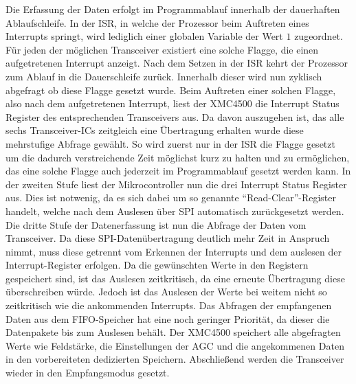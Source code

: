 Die Erfassung der Daten erfolgt im Programmablauf innerhalb der dauerhaften Ablaufschleife.
In der \acl{ISR}, in welche der Prozessor beim Auftreten eines Interrupts springt, wird lediglich einer globalen Variable der Wert $1$ zugeordnet. Für jeden der möglichen Transceiver existiert eine solche Flagge, die einen aufgetretenen Interrupt anzeigt. Nach dem Setzen in der \ac{ISR} kehrt der Prozessor zum Ablauf in die Dauerschleife zurück. Innerhalb dieser wird nun zyklisch abgefragt ob diese Flagge gesetzt wurde. Beim Auftreten einer solchen Flagge, also nach dem aufgetretenen Interrupt, liest der XMC4500 die  Interrupt Status Register des entsprechenden Transceivers aus. 
Da davon auszugehen ist, das alle sechs Transceiver-\acp{IC} zeitgleich eine Übertragung erhalten wurde diese mehrstufige Abfrage gewählt. So wird zuerst nur in der \ac{ISR} die Flagge gesetzt um die dadurch verstreichende Zeit möglichst kurz zu halten und zu ermöglichen, das eine solche Flagge auch jederzeit im Programmablauf gesetzt werden kann. In der zweiten Stufe liest der Mikrocontroller nun die drei Interrupt Status Register aus. Dies ist notwenig, da es sich dabei um so genannte \enquote{Read-Clear}-Register handelt, welche  nach dem Auslesen über SPI automatisch zurückgesetzt werden.
Die dritte Stufe  der Datenerfassung ist nun die Abfrage der Daten vom Transceiver. Da diese \ac{SPI}-Datenübertragung deutlich mehr Zeit in Anspruch nimmt, muss diese getrennt vom Erkennen der Interrupts und dem auslesen der Interrupt-Register erfolgen. Da die gewünschten Werte in den Registern gespeichert sind, ist das Auslesen zeitkritisch, da eine erneute Übertragung diese überschreiben würde. Jedoch ist das Auslesen der Werte bei weitem nicht so zeitkritisch wie die ankommenden Interrupts. Das Abfragen der empfangenen Daten aus dem \ac{FIFO}-Speicher hat eine noch geringer Priorität, da dieser die Datenpakete bis zum Auslesen behält. Der XMC4500 speichert alle abgefragten Werte wie Feldstärke, die Einstellungen der \ac{AGC} und die angekommenen Daten in den vorbereiteten dedizierten Speichern. Abschließend werden die Transceiver wieder in den Empfangsmodus gesetzt. 



